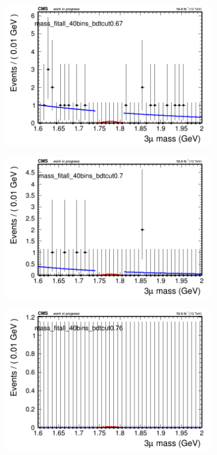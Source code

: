 \begin{figure}[H]
\begin{subfigure}{0.2\textwidth}
        \caption{}
    \end{subfigure}
    \begin{subfigure}{0.2\textwidth}
        \includegraphics[width=\textwidth]{unfixed_exp/plots/all/massfit_all_40bins_bdtcut0.67.png}
        \caption{}
    \end{subfigure}
    \begin{subfigure}{0.2\textwidth}
        \includegraphics[width=\textwidth]{unfixed_exp/plots/all/massfit_all_40bins_bdtcut0.7.png}
        \caption{}
    \end{subfigure}
    \begin{subfigure}{0.2\textwidth}
        \includegraphics[width=\textwidth]{unfixed_exp/plots/all/massfit_all_40bins_bdtcut0.76.png}

\end{subfigure}
\end{figure}
